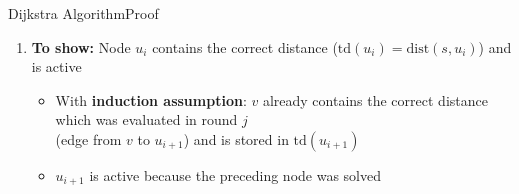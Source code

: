 
\begin{frame}{Dijkstra Algorithm}{Proof}
  \begin{figure}[!h]
    \begin{adjustbox}{width=0.9\linewidth}
      \def\DijkstraTD{1}%
      
    \end{adjustbox}
  \end{figure}
  \begin{enumerate}
    \item
      \textbf{To show:} Node {\color{Mittel-Blau}$u_i$} contains the correct
      distance ({\color{Mittel-Blau}$\mathrm{td}(u_i) = \mathrm{dist}(s, u_i)$})
      and is active
      \begin{itemize}
        \item
          With \textbf{induction assumption}:
          {\color{Mittel-Blau}$v$} already contains the correct distance which
          was evaluated in round {\color{Mittel-Blau}$j$}\\
          (edge from {\color{Mittel-Blau}$v$} to {\color{Mittel-Blau}$u_{i+1}$})
          and is stored in {\color{Mittel-Blau}$\mathrm{td}(u_{i+1})$}
        \item
          {\color{Mittel-Blau}$u_{i+1}$} is active because the preceding node
          was solved
      \end{itemize}
  \end{enumerate}
\end{frame}


